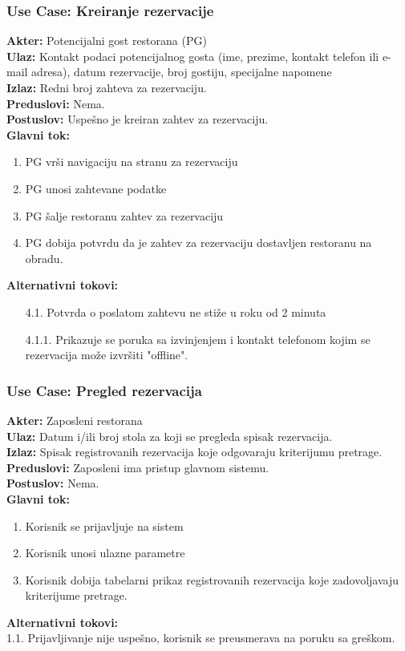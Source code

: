 \documentclass{article}
\begin{document}
\subsubsection{\textbf{Use Case}: Kreiranje rezervacije}
\textbf{Akter:} Potencijalni gost restorana (PG)\\
\textbf{Ulaz:} Kontakt podaci potencijalnog gosta (ime, prezime, kontakt telefon ili e-mail adresa), datum rezervacije, broj gostiju, specijalne napomene\\
\textbf{Izlaz:} Redni broj zahteva za rezervaciju.\\
\textbf{Preduslovi:} Nema.\\
\textbf{Postuslov:} Uspešno je kreiran zahtev za rezervaciju.\\
\textbf{Glavni tok:}
\begin{enumerate}
\item PG vrši navigaciju na stranu za rezervaciju
\item PG unosi zahtevane podatke
\item PG šalje restoranu zahtev za rezervaciju
\item PG dobija potvrdu da je zahtev za rezervaciju dostavljen restoranu na obradu.\\
\end{enumerate}
\textbf{Alternativni tokovi:}\\
\begin{itemize}
\item [4.1.]  Potvrda o poslatom zahtevu ne stiže u roku od 2 minuta
\item [4.1.1.]  Prikazuje se poruka sa izvinjenjem i kontakt telefonom kojim se rezervacija može izvršiti "offline".
\end{itemize}

\subsubsection{\textbf{Use Case}: Pregled rezervacija}
\textbf{Akter:} Zaposleni restorana\\
\textbf{Ulaz:} Datum i/ili broj stola za koji se pregleda spisak rezervacija.\\
\textbf{Izlaz:} Spisak registrovanih rezervacija koje odgovaraju kriterijumu pretrage.\\
\textbf{Preduslovi:} Zaposleni ima pristup glavnom sistemu.\\
\textbf{Postuslov:} Nema.\\
\textbf{Glavni tok:}
\begin{enumerate}
\item Korisnik se prijavljuje na sistem
\item Korisnik unosi ulazne parametre
\item Korisnik dobija tabelarni prikaz registrovanih rezervacija koje zadovoljavaju kriterijume pretrage.\\
\end{enumerate}
\textbf{Alternativni tokovi:}\\
        1.1. Prijavljivanje nije uspešno, korisnik se preusmerava na poruku sa greškom.\\
\end{document}
